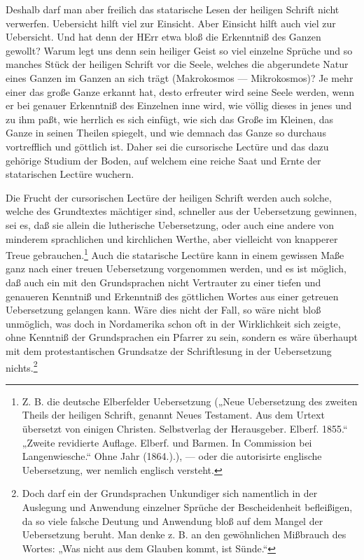 Deshalb darf man aber freilich das statarische Lesen der heiligen Schrift nicht verwerfen. Uebersicht hilft viel zur Einsicht. Aber Einsicht hilft auch viel zur Uebersicht. Und hat denn der HErr etwa bloß die Erkenntniß des Ganzen gewollt? Warum legt uns denn sein heiliger Geist so viel einzelne Sprüche und so manches Stück der heiligen Schrift vor die Seele, welches die abgerundete Natur eines Ganzen im Ganzen an sich trägt (Makrokosmos — Mikrokosmos)? Je mehr einer das große Ganze erkannt hat, desto erfreuter wird seine Seele werden, wenn er bei genauer
Erkenntniß des Einzelnen inne wird, wie völlig dieses in jenes und zu ihm paßt, wie herrlich es sich einfügt, wie sich das Große im Kleinen, das Ganze in seinen Theilen spiegelt, und wie demnach das Ganze so durchaus vortrefflich und göttlich ist. Daher sei die cursorische Lectüre und das dazu gehörige Studium der Boden, auf welchem eine reiche Saat und Ernte der statarischen Lectüre wuchern.

Die Frucht der cursorischen Lectüre der heiligen Schrift werden auch solche, welche des Grundtextes mächtiger sind, schneller aus der Uebersetzung gewinnen, sei es, daß sie allein die lutherische Uebersetzung, oder auch eine andere von minderem sprachlichen und kirchlichen Werthe, aber vielleicht von knapperer Treue gebrauchen.\footnote{Z. B. die deutsche Elberfelder Uebersetzung („Neue Uebersetzung des zweiten Theils der heiligen Schrift, genannt Neues Testament. Aus dem Urtext übersetzt von einigen Christen. Selbstverlag der Herausgeber. Elberf. 1855.“ „Zweite revidierte Auflage. Elberf. und Barmen. In Commission bei Langenwiesche.“ Ohne Jahr (1864.).), — oder die autorisirte englische Uebersetzung, wer nemlich englisch versteht.} Auch die statarische Lectüre kann in einem gewissen Maße ganz nach einer treuen Uebersetzung vorgenommen werden, und es ist möglich, daß auch ein mit den Grundsprachen nicht Vertrauter zu einer tiefen und genaueren Kenntniß und Erkenntniß des göttlichen Wortes aus einer getreuen Uebersetzung gelangen kann. Wäre dies nicht der Fall, so wäre nicht bloß unmöglich, was doch in Nordamerika schon oft in der Wirklichkeit sich zeigte, ohne Kenntniß der Grundsprachen ein Pfarrer zu sein, sondern es wäre
überhaupt mit dem protestantischen Grundsatze der Schriftlesung in der Uebersetzung nichts.\footnote{Doch darf ein der Grundsprachen Unkundiger sich namentlich in der Auslegung und Anwendung einzelner Sprüche der Bescheidenheit befleißigen, da so viele falsche Deutung und Anwendung bloß auf dem Mangel der Uebersetzung beruht. Man denke z. B. an den gewöhnlichen Mißbrauch des Wortes: „Was nicht aus dem Glauben kommt, ist Sünde.“}

